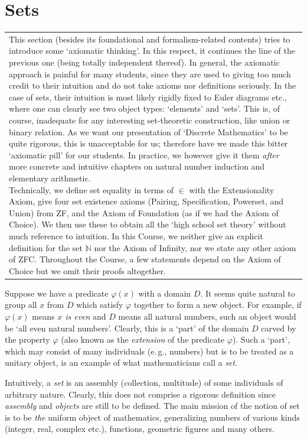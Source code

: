 \documentclass[12pt,notitlepage]{article}
\theoremstyle{plain}
\theoremstyle{definition}
\theoremstyle{plain}
\newcommand{\N}{\mathbb{N}}
\renewcommand{\phi}{\varphi}
\newcommand{\1}{\mathbf{1}}
\newcommand{\0}{\mathbf{0}}
\newcommand{\mcomm}[1]{
\medskip\noindent\begin{tabular}{| l}
\parbox{0.99\textwidth}{{\small
#1 }}\end{tabular}
\smallskip}
\begin{document}
\section{Sets}
\mcomm{This section (besides its foundational and formalism-related contents) tries to introduce some `axiomatic thinking'. In this respect, it continues the line of the previous one (being totally independent thereof). In general, the axiomatic approach is painful for many students, since they are used to giving too much credit to their intuition and do not take axioms nor definitions seriously. In the case of sets, their intuition is most likely rigidly fixed to Euler diagrams etc., where one can clearly see two object types: `elements' and `sets'. This is, of course, inadequate for any interesting set-theoretic construction, like union or binary relation. As we want our presentation of `Discrete Mathematics' to be quite rigorous, this is unacceptable for us; therefore have we made this bitter `axiomatic pill' for our students. In practice, we however give it them \emph{after} more concrete and intuitive chapters on natural number induction and elementary arithmetic.
\medskip\\
Technically, we define set equality in terms of ${\in}$ with the Extensionality Axiom, give four set existence axioms (Pairing, Specification, Powerset, and Union) from ZF, and the Axiom of Foundation (as if we had the Axiom of Choice). We then use these to obtain all the `high school set theory' without much reference to intuition. In this Course, we neither give an explicit definition for the set $\N$ nor the Axiom of Infinity, nor we state any other axiom of ZFC. Throughout the Course, a few statements depend on the Axiom of Choice but we omit their proofs altogether.
}

Suppose we have a predicate $\phi(x)$ with a domain $D$. It seems  quite natural to group all $x$ from $D$ which satisfy $\phi$ together to form a new object. For example, if $\phi(x)$ means \emph{$x$ is even} and $D$ means all natural numbers, such an object would be `all even natural numbers'. Clearly, this is a `part' of the domain $D$ carved by the property $\phi$ (also known as the \emph{extension} of the predicate $\phi$). Such a `part', which may consist of many individuals (e.\,g., numbers) but is to be treated as a unitary object, is an example of what mathematicians call a \emph{set}.


Intuitively, a \emph{set} is an assembly (collection, multitude) of some individuals of arbitrary nature. Clearly, this does not comprise a rigorous definition since \emph{assembly} and \emph{objects} are still to be defined. The main mission of the notion of set is to be \emph{the} uniform object of mathematics, generalizing numbers of various kinds (integer, real, complex etc.), functions, geometric figures and many others.
\end{document}
